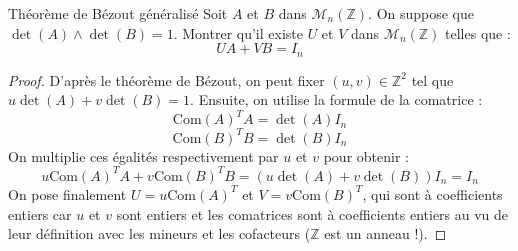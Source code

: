 \documentclass[french,a4paper]{article}
\newcommand{\Z}{\mathbb{Z}}
\theoremstyle{plain}
\theoremstyle{definition}
\theoremstyle{remark}
\begin{document}
\begin{ex}{Théorème de Bézout généralisé}
	Soit $A$ et $B$ dans $\mathcal{M}_n(\Z)$. On suppose que $\det(A)\wedge\det(B)=1$. Montrer qu'il existe $U$ et $V$ dans $\mathcal{M}_n(\Z)$ telles que : $$UA+VB=I_n$$
\end{ex}
\begin{proof}
	D'après le théorème de Bézout, on peut fixer $(u,v)\in\Z^2$ tel que $u\det(A)+v\det(B)=1$. Ensuite, on utilise la formule de la comatrice : $$\text{Com}(A)^TA=\det(A)I_n$$
	$$\text{Com}(B)^TB=\det(B)I_n$$ On multiplie ces égalités respectivement par $u$ et $v$ pour obtenir : $$u\text{Com}(A)^TA+v\text{Com}(B)^TB=(u\det(A)+v\det(B))I_n=I_n$$ On pose finalement $U=u\text{Com}(A)^T$ et $V=v\text{Com}(B)^T$, qui sont à coefficients entiers car $u$ et $v$ sont entiers et les comatrices sont à coefficients entiers au vu de leur définition avec les mineurs et les cofacteurs ($\Z$ est un anneau !).
\end{proof}
\end{document}
